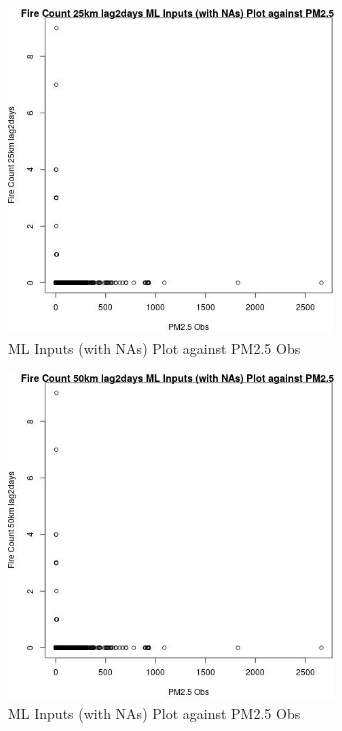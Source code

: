 \begin{figure} 
\centering  
\includegraphics[width=0.77\textwidth]{Code_Outputs/Report_ML_input_PM25_Step4_part_e_de_duplicated_aves_compiled_2019-05-21wNAs_Fire_Count_25km_lag2daysvPM25_Obs.jpg} 
\caption{\label{fig:Report_ML_input_PM25_Step4_part_e_de_duplicated_aves_compiled_2019-05-21wNAsFire_Count_25km_lag2daysvPM25_Obs}ML Inputs (with NAs) Plot against PM2.5 Obs} 
\end{figure} 
 

\clearpage 

\begin{figure} 
\centering  
\includegraphics[width=0.77\textwidth]{Code_Outputs/Report_ML_input_PM25_Step4_part_e_de_duplicated_aves_compiled_2019-05-21wNAs_Fire_Count_50km_lag2daysvPM25_Obs.jpg} 
\caption{\label{fig:Report_ML_input_PM25_Step4_part_e_de_duplicated_aves_compiled_2019-05-21wNAsFire_Count_50km_lag2daysvPM25_Obs}ML Inputs (with NAs) Plot against PM2.5 Obs} 
\end{figure} 
 


